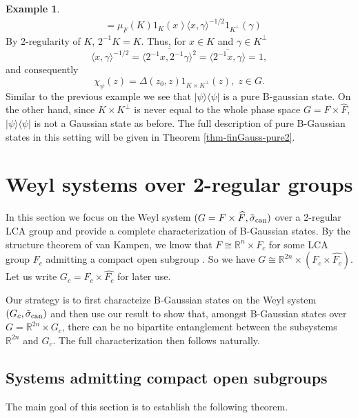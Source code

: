 \documentclass[12pt,reqno]{amsart}
\theoremstyle{definition}
\newtheorem{ex}[thm]{Example}
\theoremstyle{definition}
\theoremstyle{definition}
\numberwithin{thm}{section}
\numberwithin{equation}{section}
\newcommand{\la}{\langle}
\newcommand{\ra}{\rangle}
\newcommand{\wh}[1]{\widehat{#1}}
\newcommand{\bR}{\mathbb{R}}
\begin{document}
\begin{ex}
\begin{align*}
&=\mu_F(K)1_{K}(x)\la x, \gamma\ra^{-1/2}1_{K^{\perp}}(\gamma)
\end{align*}
By 2-regularity of $K$, $2^{-1}K=K$. Thus, for $x\in K$ and $\gamma\in K^{\perp}$
$$\la x, \gamma\ra^{-1/2}=\overline{\la 2^{-1}x, 2^{-1}\gamma\ra^2}=\overline{\la 2^{-1}x, \gamma\ra}=1,$$
and consequently
    $$\chi_\psi(z)=\Delta(z_0,z)1_{K\times K^{\perp}}(z),\; z\in G.$$
Similar to the previous example we see that $| \psi \ra \la \psi |$ is a pure B-gaussian state. 
On the other hand, since $K\times K^{\perp}$ is never equal to the whole phase space $G=F\times \widehat{F}$, $| \psi \ra \la \psi |$ is not a Gaussian state as before. The full description of pure B-Gaussian states in this setting will be given in Theorem \ref{thm-finGauss-pure2}.
\end{ex}




\section{Weyl systems over 2-regular groups}\label{sec-2-regular}

In this section we focus on the Weyl system $(G=F\times\widehat{F}, \tilde{\sigma}_{\rm can})$ over a 2-regular LCA group and provide a complete characterization of B-Gaussian states. By the structure theorem of van Kampen, we know that $F\cong \bR^n\times F_c$ for some LCA group $F_c$ admitting a compact open subgroup \cite[24.30]{HewittRoss}.
So we have $G\cong \bR^{2n}\times (F_c\times\wh{F_c})$. Let us write $G_c = F_c\times\wh{F_c}$ for later use. 

Our strategy is to first characteize B-Gaussian states on the Weyl system $(G_c, \tilde{\sigma}_{\rm can})$ and then use our result to show that, amongst B-Gaussian states over $G=\bR^{2n}\times G_c$, there can be no bipartite entanglement between the subsystems $\bR^{2n}$ and $G_c$. The full characterization then follows naturally.


\subsection{Systems admitting compact open subgroups} \label{sec-compactopen}
 
The main goal of this section is to establish the following theorem.
\end{document}
